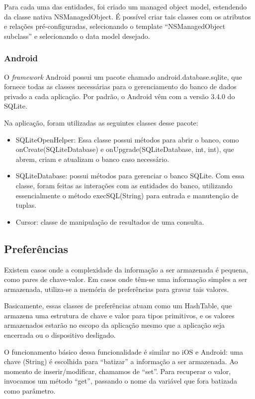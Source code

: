 			Para cada uma das entidades, foi criado um managed object model, estendendo da classe nativa NSManagedObject. É possível criar tais classes com os atributos e relações pré-configuradas, selecionando o template ``NSManagedObject subclass''  e selecionando o data model desejado.
     
    \subsubsection{Android}
     
    O \emph{framework} Android possui um pacote chamado android.database.sqlite, que fornece todas as classes necessárias para o gerenciamento do banco de dados privado a cada aplicação. Por padrão, o Android vêm com a versão 3.4.0 do SQLite.
    
	Na aplicação, foram utilizadas as seguintes classes desse pacote:
\begin{itemize}
\item SQLiteOpenHelper: Essa classe possui métodos para abrir o banco, como onCreate(SQLiteDatabase) e onUpgrade(SQLiteDatabase, int, int), que abrem, criam e atualizam o banco caso necessário.
\item SQLiteDatabase: possui métodos para gerenciar o banco SQLite. Com essa classe, foram feitas as interações com as entidades do banco, utilizando essencialmente o método execSQL(String) para entrada e manutenção de tuplas.
\item Cursor: classe de manipulação de resultados de uma consulta.
\end{itemize}     
     
    \subsection {Preferências}
            Existem casos onde a complexidade da informação a ser armazenada é pequena, como pares de chave-valor. Em casos onde têm-se uma informação simples a ser armazenada, utiliza-se a memória de preferências para gravar tais valores.
            
			Basicamente, essas classes de preferências atuam como um HashTable, que armazena uma estrutura de chave e valor para tipos primitivos, e os valores armazenados estarão no escopo da aplicação mesmo que a aplicação seja encerrada ou o dispositivo desligado.
           
		    O funcionamento básico dessa funcionalidade é similar no iOS e Android: uma chave (String) é escolhida para ``batizar'' a informação a ser armazenada. Ao momento de inserir/modificar, chamamos de ``set''.  Para recuperar o valor, invocamos um método ``get'', passando o nome da variável que fora batizada como parâmetro.
            
